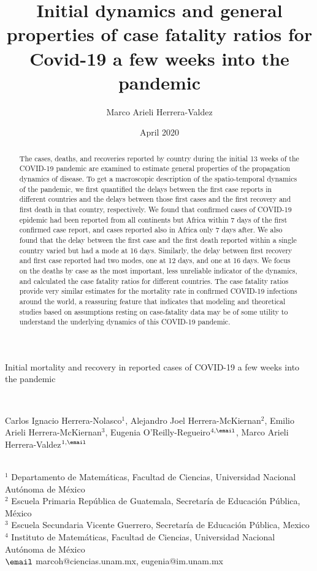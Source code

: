 \documentclass[8pt]{article}
\title{Initial dynamics and general properties of case fatality ratios for Covid-19 a few weeks into the pandemic}
\author{Marco Arieli Herrera-Valdez}
\date{April 2020}
\begin{document}
%
\begin{flushleft}
\begin{Large}
{Initial mortality and recovery in reported cases of COVID-19 a few weeks into the pandemic}
\end{Large}\\
\smallskip
\begin{large}
Carlos Ignacio Herrera-Nolasco$^1$, Alejandro Joel Herrera-McKiernan$^2$, 
Emilio Arieli Herrera-McKiernan$^3$, Eugenia O'Reilly-Regueiro$^{4,\email}$,
Marco Arieli Herrera-Valdez$^{1,\email}$
\end{large}\\
\smallskip
$^1$ Departamento de Matemáticas, Facultad de Ciencias, Universidad Nacional Autónoma de México\\
$^2$ Escuela Primaria República de Guatemala, Secretaría de Educación Pública, México\\
$^3$ Escuela Secundaria Vicente Guerrero, Secretaría de Educación Pública, Mexico\\
$^4$ Instituto de Matemáticas, Facultad de Ciencias, Universidad Nacional Autónoma de México\\
$\email$ marcoh@ciencias.unam.mx, eugenia@im.unam.mx
\end{flushleft}

\begin{abstract} The cases, deaths, and recoveries reported by country during the initial 13 weeks of the COVID-19 pandemic are examined to estimate general properties of the propagation dynamics of disease. To get a macroscopic description of the spatio-temporal dynamics of the pandemic, we first quantified the delays between the first case reports in different countries and the delays between those first cases and the first recovery and first death in that country, respectively. We found that confirmed cases of COVID-19 epidemic had been reported from all continents but Africa within 7 days of the first confirmed case report, and cases reported also in Africa only 7 days after. We also found that the delay between the first case and the first death reported within a single country varied but had a mode at 16 days. Similarly, the delay between first  recovery and first case reported had two modes, one at 12 days, and one at 16 days. 
    We focus on the deaths by case as the most important, less unreliable indicator of the dynamics, and calculated the case fatality ratios for different countries. The case fatality ratios provide very similar estimates for the mortality rate in confirmed COVID-19 infections around the world, a reassuring feature that indicates that modeling and theoretical studies based on assumptions resting on case-fatality data may be of some utility to understand the underlying dynamics of this COVID-19 pandemic. 

\end{abstract}
\end{document}
